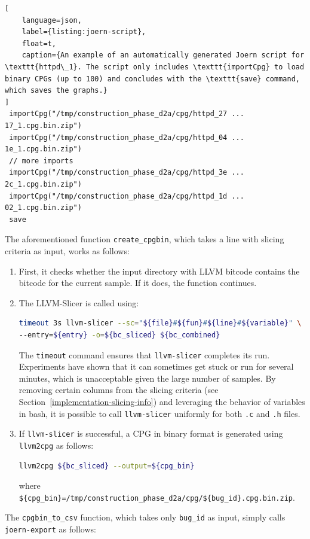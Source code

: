 \begin{lstlisting}[
    language=json, 
    label={listing:joern-script}, 
    float=t,
    caption={An example of an automatically generated Joern script for \texttt{httpd\_1}. The script only includes \texttt{importCpg} to load binary CPGs (up to 100) and concludes with the \texttt{save} command, which saves the graphs.}
]
 importCpg("/tmp/construction_phase_d2a/cpg/httpd_27 ... 17_1.cpg.bin.zip")
 importCpg("/tmp/construction_phase_d2a/cpg/httpd_04 ... 1e_1.cpg.bin.zip")
 // more imports
 importCpg("/tmp/construction_phase_d2a/cpg/httpd_3e ... 2c_1.cpg.bin.zip")
 importCpg("/tmp/construction_phase_d2a/cpg/httpd_1d ... 02_1.cpg.bin.zip")
 save
\end{lstlisting}

The aforementioned function \texttt{create\_cpgbin}, which takes a line with slicing criteria as input, works as follows:
\begin{enumerate}
\item First, it checks whether the input directory with LLVM bitcode contains the bitcode for the current sample. If it does, the function continues.
\item The LLVM-Slicer is called using:
\begin{lstlisting}[language=bash, xleftmargin=1em]
timeout 3s llvm-slicer --sc="${file}#${fun}#${line}#${variable}" \
--entry=${entry} -o=${bc_sliced} ${bc_combined}
\end{lstlisting}
The \texttt{timeout} command ensures that \texttt{llvm-slicer} completes its run. Experiments have shown that it can sometimes get stuck or run for several minutes, which is unacceptable given the large number of samples. By removing certain columns from the slicing criteria (see Section~\ref{implementation-slicing-info}) and leveraging the behavior of variables in bash, it is possible to call \texttt{llvm-slicer} uniformly for both \texttt{.c} and \texttt{.h} files.
\item If \texttt{llvm-slicer} is successful, a CPG in binary format is generated using \texttt{llvm2cpg} as follows:
\begin{lstlisting}[language=bash, xleftmargin=1em]
llvm2cpg ${bc_sliced} --output=${cpg_bin}
\end{lstlisting}
where \texttt{\$\{cpg\_bin\}=/tmp/construction\_phase\_d2a/cpg/\$\{bug\_id\}.cpg.bin.zip}.
\end{enumerate}

The \texttt{cpgbin\_to\_csv} function, which takes only \texttt{bug\_id} as input, simply calls \texttt{joern-export} as follows:

